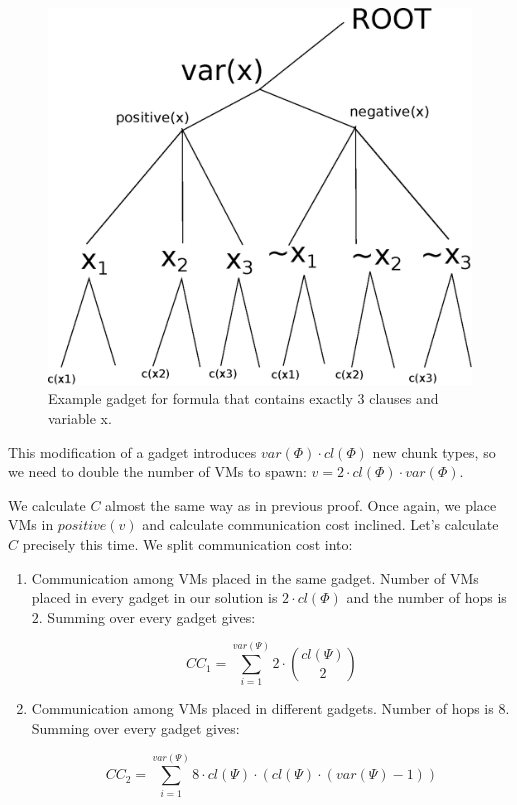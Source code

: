 \begin{figure}[htbp]
\includegraphics[width = \columnwidth]{figs/gadget-new.eps}
\caption{Example gadget for formula that contains exactly 3 clauses
and variable x.}
\label{fig:gadgets}
\end{figure}

This modification of a gadget introduces
$var(\Phi) \cdot cl(\Phi)$ new chunk types, so we need to double the number of VMs to
spawn: $v = 2 \cdot cl(\Phi)\cdot var(\Phi)$.


We calculate $C$ almost the same way as in previous proof. Once again,
we place VMs in $positive(v)$ and calculate communication cost
inclined. Let's calculate $C$ precisely this time. We split
communication cost into:
\begin{enumerate}
\item Communication among VMs placed in the same gadget. Number of VMs
placed in every gadget in our solution is $2\cdot cl(\Phi)$ and the
number of hops is $2$. Summing over every gadget gives:

$$ CC_1 = \sum_{i=1}^{var(\Psi)}2\cdot {cl(\Psi) \choose 2} $$

\item Communication among VMs placed in different gadgets. Number of
hops is $8$. Summing over every gadget gives:

$$ CC_2 = \sum_{i=1}^{var(\Psi)} 8 \cdot cl(\Psi) \cdot (cl(\Psi) \cdot (var(\Psi) - 1))$$
\end{enumerate}

